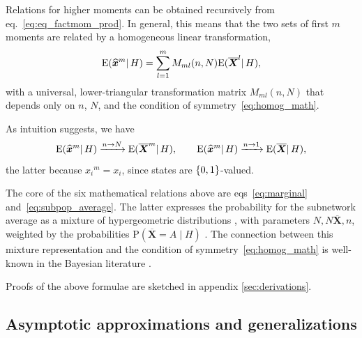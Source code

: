 \documentclass{article}
\newcommand*{\citep}{\parencites}
\theoremstyle{innote}
\newcommand*{\av}{\overline} %
\newcommand*{\sav}{\widehat} %
\newcommand*{\yx}{\bm{x}}%
\newcommand*{\yxs}{\sav{\yx}}%
\newcommand*{\yX}{\bm{X}}%
\newcommand*{\yXf}{\av{\yX}}%
\newcommand*{\yH}{\varEta}
\DeclarePairedDelimiter\set{\{}{\}}
\newcommand*{\cf}{{cf.}}
\newcommand*{\cond}%
{\mathpunct{|}}%
\newcommand*{\p}{\mathrm{P}}%
\renewcommand*{\|}{\cond}
\newcommand*{\+}{\lor}
\newcommand*{\sect}{\S}%
\newcommand*{\chap}{ch.}%
\newcommand*{\eqn}{eq.}%
\newcommand*{\eqns}{eqs}%
\let\varEta H
\newcommand*{\E}{\mathrm{E}}
\DeclarePairedDelimiter\expp{(}{)}
\newcommand*{\expe}{\E\expp}%
\begin{document}
Relations for higher moments can be obtained recursively from
\eqn~\eqref{eq:eq_factmom_prod}. In general, this means that the two sets of
first $m$ moments are related by a homogeneous linear transformation,
\begin{equation}
  \label{eq:lin_transf_moments}
  \expe{\yxs^m \cond \yH} = \sum_{l=1}^m M_{ml}(n,N) \expe{\yXf^l \cond \yH},
\end{equation}
with a universal, lower-triangular transformation matrix $M_{ml}(n,N)$ that
depends only on $n$, $N$, and the condition of symmetry~\eqref{eq:homog_math}.

As intuition suggests, we have
\begin{equation}
  \label{eq:limit_moments}
  \expe{\yxs^m \cond \yH} \xrightarrow{n\to N}
  \expe{\yXf^m \cond \yH},
\qquad
  \expe{\yxs^m \cond \yH} \xrightarrow{n\to 1}
  \expe{\yXf \cond \yH},
\end{equation}
the latter because ${x_i}^m=x_i$, since states are $\set{0,1}$-valued.

\bigskip

The core of the six mathematical relations above are
\eqns~\eqref{eq:marginal} and~\eqref{eq:subpop_average}. The latter
expresses the probability for the subnetwork average as a mixture of
hypergeometric distributions
\cites[\chap~3]{jaynes1994_r2003}[\sect~4.8.3]{ross1976_r2010}[\sect~II.6]{feller1950_r1968},
with parameters $N,N\yXf,n$, weighted by the probabilities
$\p(\yXf = A \cond\yH)$ \citep[\cf][\sect~4, esp.\ \eqn~(22)]{kendall1967}.
The connection between this mixture representation and the condition of
symmetry~\eqref{eq:homog_math} is well-known in the Bayesian literature
\citep{kendall1967,definetti1969b,heathetal1976,diaconis1977,diaconisetal1980,jaynes1986c}.

Proofs of the above formulae are sketched in appendix
\ref{sec:derivations}.

\subsection{Asymptotic approximations and generalizations}
\label{sec:limits}
\end{document}
